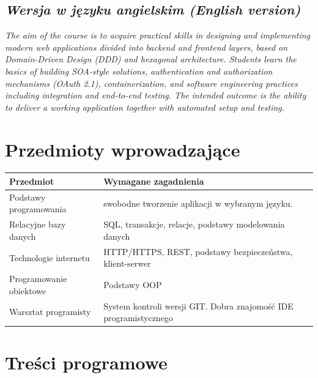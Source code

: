\documentclass[12pt, a4paper]{article}
\newcommand{\thdrule}{\noalign{\global\setlength{\extrarowheight}{0pt}}}
\newcommand{\thdend}{\noalign{\global\setlength{\extrarowheight}{3pt}}}
\begin{document}
\subsection*{\textit{Wersja w języku angielskim (English version)}}

\textit{The aim of the course is to acquire practical skills in designing and implementing modern web applications divided into backend and frontend layers, based on Domain-Driven Design (DDD) and hexagonal architecture. Students learn the basics of building SOA-style solutions, authentication and authorization mechanisms (OAuth 2.1), containerization, and software engineering practices including integration and end-to-end testing. The intended outcome is the ability to deliver a working application together with automated setup and testing.}


\section{Przedmioty wprowadzające}

{\scriptsize
\begin{tabularx}{\textwidth}{m{5cm}Y}
\thdrule\toprule
{} {\color{white}\textbf{Przedmiot}} & {\color{white}\textbf{Wymagane zagadnienia}} \\
\midrule\thdend
   Podstawy programowania & swobodne tworzenie aplikacji w wybranym języku. \\
   Relacyjne bazy danych & SQL, transakcje, relacje, podstawy modelowania danych \\
   Technologie internetu & HTTP/HTTPS, REST, podstawy bezpieczeństwa, klient-serwer \\
   Programowanie obiektowe & Podstawy OOP \\
   Warsztat programisty & System kontroli wersji GIT. Dobra znajomość IDE programistycznego \\
\bottomrule
\end{tabularx}}

\section{Treści programowe}
\end{document}
